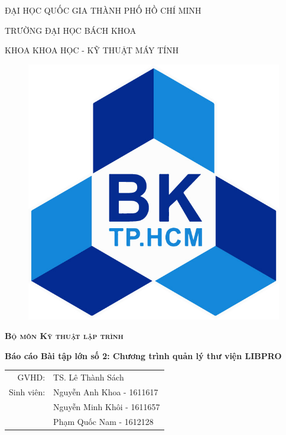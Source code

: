 \documentclass[12pt,a4paper]{report}
\begin{document}
	\begin{titlepage}
		\begin{center}
			{\scshape\large ĐẠI HỌC QUỐC GIA THÀNH PHỐ HỒ CHÍ MINH\par}
					{\scshape\LARGE TRƯỜNG ĐẠI HỌC BÁCH KHOA\par}
			{\scshape\Large KHOA KHOA HỌC - KỸ THUẬT MÁY TÍNH}
			\vspace{2cm}

		\end{center}
		\begin{figure}[h]
			\centering
			\includegraphics[scale=.2]{LogoBK.jpg}
		\end{figure}
		\vspace{2cm}
		\begin{center}
			{\scshape \LARGE \textbf{Bộ môn Kỹ thuật lập trình}\par}
			\vspace{1cm}
			\Large \textbf{Báo cáo Bài tập lớn số 2: Chương trình quản lý thư viện LIBPRO}
		\end{center}
		\vspace{2cm}
		\begin{center}
			\begin{tabular}{r l}
				GVHD:&TS. Lê Thành Sách\\
				Sinh viên:&Nguyễn Anh Khoa - 1611617\\
				&Nguyễn Minh Khôi - 1611657\\
				&Phạm Quốc Nam - 1612128\\
			\end{tabular}\\
		\end{center}
	\end{titlepage}
\newpage
\end{document}
